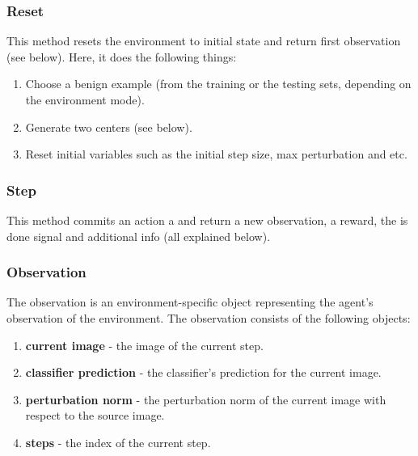 \documentclass{article}
\begin{document}
\subsubsection{Reset}
This method resets the environment to initial state and return first observation (see below).
Here, it does the following things:
\begin{enumerate}
\item Choose a benign example (from the training or the testing sets, depending on the environment mode).
\item Generate two centers (see below).
\item Reset initial variables such as the initial step size, max perturbation and etc.
\end{enumerate}

\subsubsection{Step}
This method commits an action a and return a new observation,  a reward, the is done signal and additional info (all explained below).

\subsubsection{Observation}
The observation is an environment-specific object representing the agent's observation of the environment. The observation consists of the following objects:
\begin{enumerate}
\item \textbf{current image} - the image of the current step.
\item \textbf{classifier prediction} - the classifier's prediction for the current image.
\item \textbf{perturbation norm} - the perturbation norm of the current image with respect to the source image.
\item \textbf{steps} - the index of the current step.
\end{enumerate}
\end{document}
